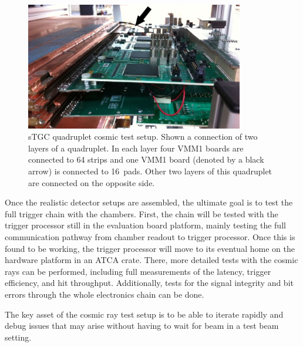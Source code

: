 \begin{figure}[h]
  \centering
  \includegraphics[width=0.85\textwidth]{figures/testing/WeizmannQuardupletCosmicSetup.JPG}
  \caption{sTGC quadruplet cosmic test setup. Shown a connection of two layers of a quadruplet. In each layer
  four VMM1 boards are connected to 64 strips and one VMM1 board (denoted by a black arrow) is connected to 16~pads.
  Other two layers of this quadruplet are connected on the opposite side.}
  \label{fig:WeizmannQuardupletCosmicSetup}
\end{figure}

\FloatBarrier

Once the realistic detector setups are assembled, the ultimate goal is to test the full
trigger chain with the chambers. First, the chain will be
tested with the trigger processor still in the evaluation board
platform, mainly testing the full communication pathway from chamber readout
to trigger processor. Once this is found to be working, the trigger
processor will move to its eventual home on the hardware platform in
an ATCA crate. There, more detailed tests with the cosmic rays can be
performed, including full measurements of the latency, trigger
efficiency, and hit throughput. Additionally, tests for the signal
integrity and bit errors through the whole electronics chain can be
done.

The key asset of the cosmic ray test setup is to be
able to iterate rapidly and debug issues that may arise without having
to wait for beam in a test beam setting.






